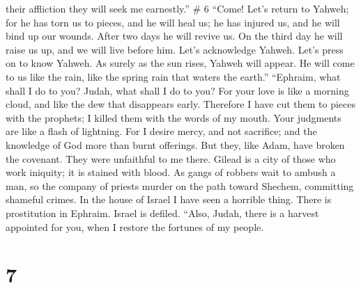 their affliction they will seek me earnestly.'' \# 6 
``Come! Let's return to Yahweh; for he has torn us to pieces, and he
will heal us; he has injured us, and he will bind up our wounds.
 After two days he will revive us. On the third day he
will raise us up, and we will live before him.  Let's
acknowledge Yahweh. Let's press on to know Yahweh. As surely as the sun
rises, Yahweh will appear. He will come to us like the rain, like the
spring rain that waters the earth.''  ``Ephraim, what
shall I do to you? Judah, what shall I do to you? For your love is like
a morning cloud, and like the dew that disappears early. 
Therefore I have cut them to pieces with the prophets; I killed them
with the words of my mouth. Your judgments are like a flash of
lightning.  For I desire mercy, and not sacrifice; and the
knowledge of God more than burnt offerings.  But they,
like Adam, have broken the covenant. They were unfaithful to me there.
 Gilead is a city of those who work iniquity; it is
stained with blood.  As gangs of robbers wait to ambush a
man, so the company of priests murder on the path toward Shechem,
committing shameful crimes.  In the house of Israel I
have seen a horrible thing. There is prostitution in Ephraim. Israel is
defiled.  ``Also, Judah, there is a harvest appointed for
you, when I restore the fortunes of my people.

\hypertarget{section-4}{%
\section{7}\label{section-4}}

